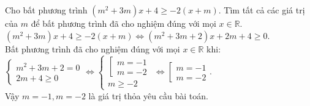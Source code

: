 \begin{bt}%
	Cho bất phương trình $(m^2+3m)x + 4 \geq -2(x+m)$. Tìm tất cả các giá trị của $m$ để bất phương trình đã cho nghiệm đúng với mọi $x \in \mathbb{R}$.
	\loigiai
	{
		$(m^2+3m)x + 4 \geq -2(x+m) \Leftrightarrow (m^2+3m+2)x + 2m+4 \geq 0$.\\
		Bất phương trình đã cho nghiệm đúng với mọi $x \in \mathbb{R}$ khi:\\
		$\left\{\begin{array}{l}
		m^2+3m+2 =0\\ 2m+4 \geq 0
		\end{array}  \right. 
		\Leftrightarrow \left\{\begin{array}{l}
		\left[\begin{array}{l}
		m=-1 \\ m=-2
		\end{array}  \right. \\ m \geq -2
		\end{array}  \right. \Leftrightarrow \left[\begin{array}{l}
		m=-1 \\ m=-2
		\end{array}  \right.$.\\
		Vậy $m=-1, m =-2$ là giá trị thỏa yêu cầu bài toán.
	}
\end{bt}

